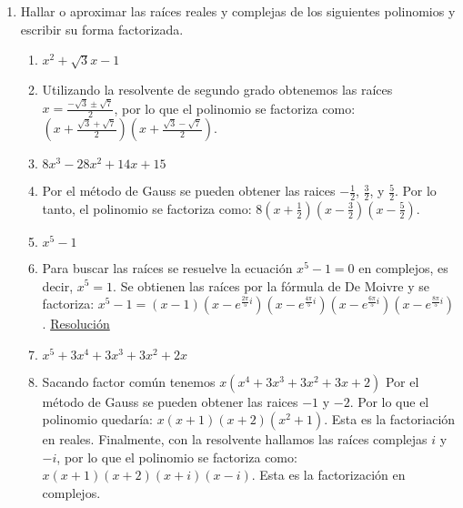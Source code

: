\documentclass[a4paper]{article}
\newcommand{\answer}{\item[**]}
\newcommand{\exercise}{\item}
\newcommand{\df}[2]{\displaystyle\frac{#1}{#2}}
\begin{document}
\begin{enumerate}
\begin{enumerate} [label=(\alph*)]
		\item $Q(\gamma)=P(4)$ ~~~~con $P(x)=x-1$ ~~~~y $Q(x)=2x^2-4x$
		\answer $Q(\gamma)=2 \gamma^2-4\gamma = (4)-1= P(4)$ por lo que obtenemos la ecuación $2 \gamma^2-4\gamma -3 = 0$, de donde despejamos los valores de $\gamma = 1 \pm \sqrt{\df{5}{2}}$.

		\item $3x^2+\gamma x+4$ tiene a 1 como raíz
		\answer $\gamma=-7$. \href{https://youtu.be/09D5Z3dcaXc}{Resolución}

		\item $x^3+\alpha x^2+\beta x+5$ es divisible por $Q(x)=x^2+x+1$
		\answer $\alpha=6$ y $\beta=6$. \href{https://youtu.be/jE5a43IQ91E}{Resolución}

	\end{enumerate}

	\exercise Hallar o aproximar las raíces reales y complejas de los siguientes polinomios y escribir su forma factorizada. 

	\begin{multicols}{2}
	\begin{enumerate} [label=(\alph*)]
		
		\item $x^2+\sqrt{3}x-1$
		\answer Utilizando la resolvente de segundo grado obtenemos las raíces $x=\df{-\sqrt{3}\pm\sqrt{7}}{2}$, por lo que el polinomio se factoriza como: $\left(x+\df{\sqrt{3}+\sqrt{7}}{2}\right)\left(x+\df{\sqrt{3}-\sqrt{7}}{2}\right)$.

		\item $8x^3-28x^2+14x+15$
		\answer Por el método de Gauss se pueden obtener las raices $-\df{1}{2}$, $\df{3}{2}$, y $\df{5}{2}$. Por lo tanto, el polinomio se factoriza como: $8\left(x+\df{1}{2}\right)\left(x-\df{3}{2}\right)\left(x-\df{5}{2}\right)$.

		\item $x^5-1$
		\answer Para buscar las raíces se resuelve la ecuación $x^5-1=0$ en complejos, es decir, $x^5=1$. Se obtienen las raíces por la fórmula de De Moivre y se factoriza: $x^5-1=(x-1)(x-e^{\frac{2\pi}{5}i})(x-e^{\frac{4\pi}{5}i})(x-e^{\frac{6\pi}{5}i})(x-e^{\frac{8\pi}{5}i})$. \href{https://youtu.be/ZMBXAdxOleM}{Resolución}

		\item $x^5+3x^4+3x^3+3x^2+2x$
		\answer Sacando factor común tenemos $x(x^4+3x^3+3x^2+3x+2)$ Por el método de Gauss se pueden obtener las raices $-1$ y $-2$. Por lo que el polinomio quedaría: $x(x+1)(x+2)(x^2+1)$. Esta es la factoriación en reales. Finalmente, con la resolvente hallamos las raíces complejas $i$ y $-i$, por lo que el polinomio se factoriza como: $x(x+1)(x+2)(x+i)(x-i)$. Esta es la factorización en complejos.
		

\end{enumerate}
\end{multicols}
\end{enumerate}
\end{document}
